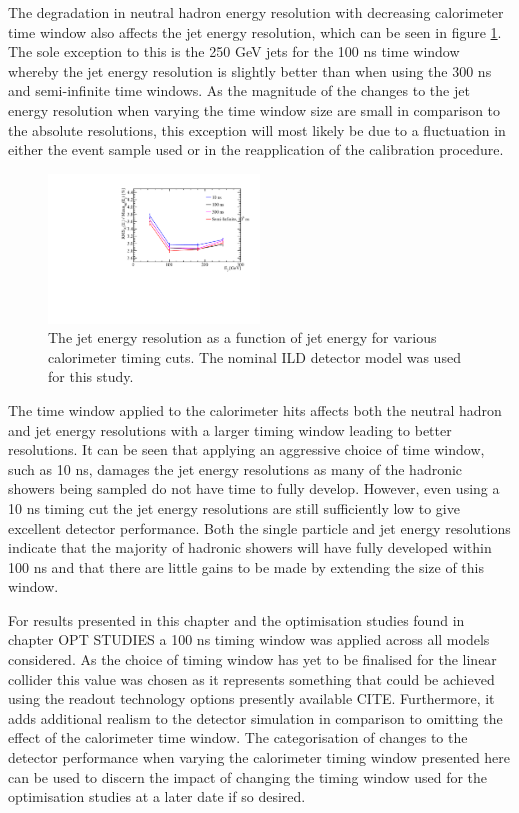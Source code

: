 The degradation in neutral hadron energy resolution with decreasing calorimeter time window also affects the jet energy resolution, which can be seen in figure \ref{fig:jertimingcuts}.  The sole exception to this is the 250 GeV jets for the 100 ns time window whereby the jet energy resolution is slightly better than when using the 300 ns and semi-infinite time windows.  As the magnitude of the changes to the jet energy resolution when varying the time window size are small in comparison to the absolute resolutions, this exception will most likely be due to a fluctuation in either the event sample used or in the reapplication of the calibration procedure.  

\begin{figure}
\includegraphics[width=0.5\textwidth]{EnergyEstimators/Plots/TimingCuts/JER_vs_JetEnergy_TimingCutStudies.pdf}
\caption[The jet energy resolution as a function of jet energy for various calorimeter timing cuts.  The results shown use the nominal ILD detector model.]{The jet energy resolution as a function of jet energy for various calorimeter timing cuts.  The nominal ILD detector model was used for this study.}
\label{fig:jertimingcuts}
\end{figure}

The time window applied to the calorimeter hits affects both the neutral hadron and jet energy resolutions with a larger timing window leading to better resolutions.  It can be seen that applying an aggressive choice of time window, such as 10 ns, damages the jet energy resolutions as many of the hadronic showers being sampled do not have time to fully develop.  However, even using a 10 ns timing cut the jet energy resolutions are still sufficiently low to give excellent detector performance.  Both the single particle and jet energy resolutions indicate that the majority of hadronic showers will have fully developed within 100 ns and that there are little gains to be made by extending the size of this window.  

For results presented in this chapter and the optimisation studies found in chapter OPT STUDIES a 100 ns timing window was applied across all models considered.  As the choice of timing window has yet to be finalised for the linear collider this value was chosen as it represents something that could be achieved using the readout technology options presently available CITE.  Furthermore, it adds additional realism to the detector simulation in comparison to omitting the effect of the calorimeter time window.  The categorisation of changes to the detector performance when varying the calorimeter timing window presented here can be used to discern the impact of changing the timing window used for the optimisation studies at a later date if so desired.  

